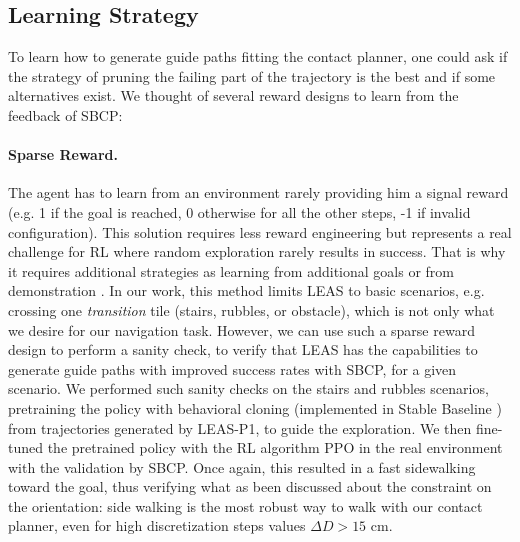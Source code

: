 \subsection{Learning Strategy}
To learn how to generate guide paths fitting the contact planner, one could ask if the strategy of pruning the failing part of the trajectory is the best and if some alternatives exist.
We thought of several reward designs to learn from the feedback of SBCP:
\paragraph{Sparse Reward.} 
The agent has to learn from an environment rarely providing him a signal reward (e.g. 1 if the goal is reached, 0 otherwise for all the other steps, -1 if invalid configuration). 
This solution requires less reward engineering but represents a real challenge for RL where random exploration rarely results in success. That is why it requires additional strategies as learning from additional goals \cite{HER,sparse_heess} or from demonstration \cite{DDPGfd, pretraining_BC}. 
In our work, this method limits LEAS to basic scenarios, e.g. crossing one \textit{transition} tile (stairs, rubbles, or obstacle), which is not only what we desire for our navigation task.
However, we can use such a sparse reward design to perform a sanity check, to verify that LEAS has the capabilities to generate guide paths with improved success rates with SBCP, for a given scenario.
We performed such sanity checks on the stairs and rubbles scenarios, pretraining the policy with behavioral cloning (implemented in Stable Baseline \cite{stable-baselines}) from trajectories generated by LEAS-P1, to guide the exploration. We then fine-tuned the pretrained policy with the RL algorithm PPO in the real environment with the validation by SBCP. Once again, this resulted in a fast sidewalking toward the goal, thus verifying what as been discussed about the constraint on the orientation: side walking is the most robust way to walk with our contact planner, even for high discretization steps values $\Delta D>15$ cm.

